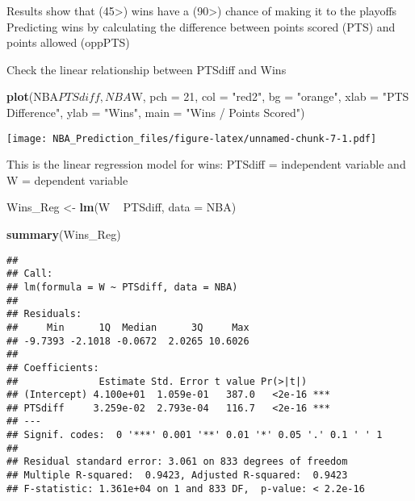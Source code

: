 \documentclass[]{article}
\newenvironment{Shaded}{\begin{snugshade}}{\end{snugshade}}
\newcommand{\KeywordTok}[1]{\textcolor[rgb]{0.13,0.29,0.53}{\textbf{{#1}}}}
\newcommand{\DataTypeTok}[1]{\textcolor[rgb]{0.13,0.29,0.53}{{#1}}}
\newcommand{\DecValTok}[1]{\textcolor[rgb]{0.00,0.00,0.81}{{#1}}}
\newcommand{\StringTok}[1]{\textcolor[rgb]{0.31,0.60,0.02}{{#1}}}
\newcommand{\NormalTok}[1]{{#1}}
\begin{document}
Results show that (45\textgreater{}) wins have a (90\textgreater{})
chance of making it to the playoffs Predicting wins by calculating the
difference between points scored (PTS) and points allowed (oppPTS)

\begin{Shaded}
\end{Shaded}

Check the linear relationship between PTSdiff and Wins

\begin{Shaded}
\begin{Highlighting}[]
\KeywordTok{plot}\NormalTok{(NBA$PTSdiff, NBA$W, }\DataTypeTok{pch =} \DecValTok{21}\NormalTok{, }\DataTypeTok{col =} \StringTok{"red2"}\NormalTok{, }\DataTypeTok{bg =} \StringTok{"orange"}\NormalTok{,}
     \DataTypeTok{xlab =} \StringTok{"PTS Difference"}\NormalTok{, }\DataTypeTok{ylab =} \StringTok{"Wins"}\NormalTok{, }\DataTypeTok{main =} \StringTok{"Wins / Points Scored"}\NormalTok{)  }
\end{Highlighting}
\end{Shaded}

\texttt{[image: NBA\_Prediction\_files/figure-latex/unnamed-chunk-7-1.pdf]}

This is the linear regression model for wins: PTSdiff = independent
variable and W = dependent variable

\begin{Shaded}
\begin{Highlighting}[]
\NormalTok{Wins_Reg <-}\StringTok{ }\KeywordTok{lm}\NormalTok{(W ~}\StringTok{ }\NormalTok{PTSdiff, }\DataTypeTok{data =} \NormalTok{NBA)}

\KeywordTok{summary}\NormalTok{(Wins_Reg)}
\end{Highlighting}
\end{Shaded}

\begin{verbatim}
## 
## Call:
## lm(formula = W ~ PTSdiff, data = NBA)
## 
## Residuals:
##     Min      1Q  Median      3Q     Max 
## -9.7393 -2.1018 -0.0672  2.0265 10.6026 
## 
## Coefficients:
##              Estimate Std. Error t value Pr(>|t|)    
## (Intercept) 4.100e+01  1.059e-01   387.0   <2e-16 ***
## PTSdiff     3.259e-02  2.793e-04   116.7   <2e-16 ***
## ---
## Signif. codes:  0 '***' 0.001 '**' 0.01 '*' 0.05 '.' 0.1 ' ' 1
## 
## Residual standard error: 3.061 on 833 degrees of freedom
## Multiple R-squared:  0.9423, Adjusted R-squared:  0.9423 
## F-statistic: 1.361e+04 on 1 and 833 DF,  p-value: < 2.2e-16
\end{verbatim}
\end{document}
